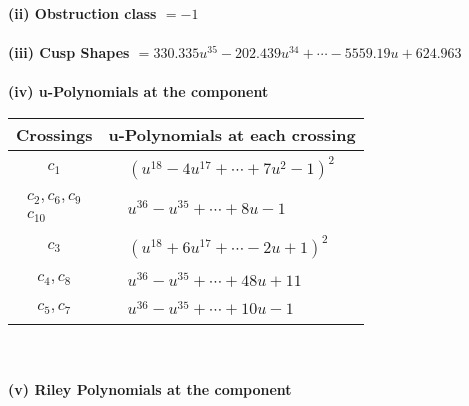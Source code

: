 \documentclass[1p]{elsarticle_modified}
\theoremstyle{definition}
\begin{document}
\flushleft \textbf{(ii) Obstruction class $= -1$}\\~\\
\flushleft \textbf{(iii) Cusp Shapes $= 330.335 u^{35}-202.439 u^{34}+\cdots-5559.19 u+624.963$}\\~\\
\newpage\renewcommand{\arraystretch}{1}
\flushleft \textbf{(iv) u-Polynomials at the component}\newline \\
\begin{tabular}{m{50pt}|m{274pt}}
Crossings & \hspace{64pt}u-Polynomials at each crossing \\
\hline $$\begin{aligned}c_{1}\end{aligned}$$&$\begin{aligned}
&(u^{18}-4 u^{17}+\cdots+7 u^2-1)^{2}
\end{aligned}$\\
\hline $$\begin{aligned}c_{2},c_{6},c_{9}\\c_{10}\end{aligned}$$&$\begin{aligned}
&u^{36}- u^{35}+\cdots+8 u-1
\end{aligned}$\\
\hline $$\begin{aligned}c_{3}\end{aligned}$$&$\begin{aligned}
&(u^{18}+6 u^{17}+\cdots-2 u+1)^{2}
\end{aligned}$\\
\hline $$\begin{aligned}c_{4},c_{8}\end{aligned}$$&$\begin{aligned}
&u^{36}- u^{35}+\cdots+48 u+11
\end{aligned}$\\
\hline $$\begin{aligned}c_{5},c_{7}\end{aligned}$$&$\begin{aligned}
&u^{36}- u^{35}+\cdots+10 u-1
\end{aligned}$\\
\hline
\end{tabular}\\~\\
\newpage\renewcommand{\arraystretch}{1}
\flushleft \textbf{(v) Riley Polynomials at the component}\newline \\
\end{document}
